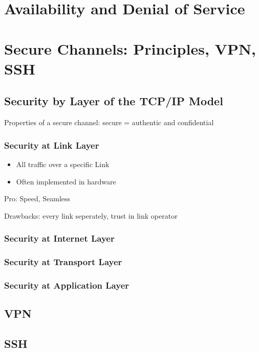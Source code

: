 \documentclass[fs, footer]{latex4ei}
\begin{document}
\begin{multicols*}{4}
\section{Availability and Denial of Service}

\section{Secure Channels: Principles, VPN, SSH}

\subsection{Security by Layer of the TCP/IP Model}
Properties of a secure channel: secure = authentic and confidential

\subsubsection{Security at Link Layer}
\begin{itemize}
	\item All traffic over a specific Link
	\item Often implemented in hardware
\end{itemize}

Pro: Speed, Seamless

Drawbacks: every link seperately, trust in link operator

\subsubsection{Security at Internet Layer}

\subsubsection{Security at Transport Layer}

\subsubsection{Security at Application Layer}

\subsection{VPN}

\subsection{SSH} 


\end{multicols*}
\end{document}
